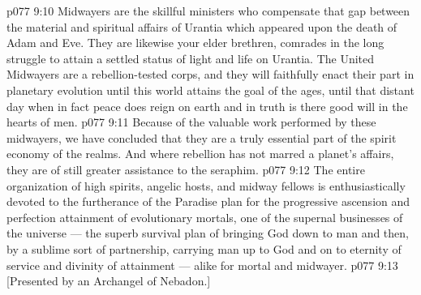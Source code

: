 \vs p077 9:10 Midwayers are the skillful ministers who compensate that gap between the material and spiritual affairs of Urantia which appeared upon the death of Adam and Eve. They are likewise your elder brethren, comrades in the long struggle to attain a settled status of light and life on Urantia. The United Midwayers are a rebellion\hyp{}tested corps, and they will faithfully enact their part in planetary evolution until this world attains the goal of the ages, until that distant day when in fact peace does reign on earth and in truth is there good will in the hearts of men.
\vs p077 9:11 Because of the valuable work performed by these midwayers, we have concluded that they are a truly essential part of the spirit economy of the realms. And where rebellion has not marred a planet’s affairs, they are of still greater assistance to the seraphim.
\vs p077 9:12 \pc The entire organization of high spirits, angelic hosts, and midway fellows is enthusiastically devoted to the furtherance of the Paradise plan for the progressive ascension and perfection attainment of evolutionary mortals, one of the supernal businesses of the universe --- the superb survival plan of bringing God down to man and then, by a sublime sort of partnership, carrying man up to God and on to eternity of service and divinity of attainment --- alike for mortal and midwayer.
\vsetoff
\vs p077 9:13 [Presented by an Archangel of Nebadon.]
\quizlink
{}
